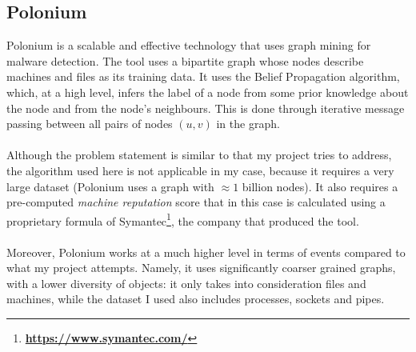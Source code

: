 	\subsection{Polonium}
	Polonium is a scalable and effective technology that uses graph mining for malware detection. The tool uses a bipartite graph whose nodes describe machines and files as its training data. It uses the Belief Propagation algorithm, which, at a high level, infers the label of a node from some prior knowledge about the node and from the node's neighbours. This is done through iterative message passing between all pairs of nodes $(u, v)$ in the graph. 
	\\ \\
	Although the problem statement is similar to that my project tries to address, the algorithm used here is not applicable in my case, because it requires a very large dataset (Polonium uses a graph with $\approx 1$ billion nodes). It also requires a pre-computed \textit{machine reputation} score that in this case is calculated using a proprietary formula of Symantec\footnote{\textbf{\url{https://www.symantec.com/}}}, the company that produced the tool. 
	\\ \\
	Moreover, Polonium works at a much higher level in terms of events compared to what my project attempts. Namely, it uses significantly coarser grained graphs, with a lower diversity of objects: it only takes into consideration files and machines, while the dataset I used also includes processes, sockets and pipes. 

